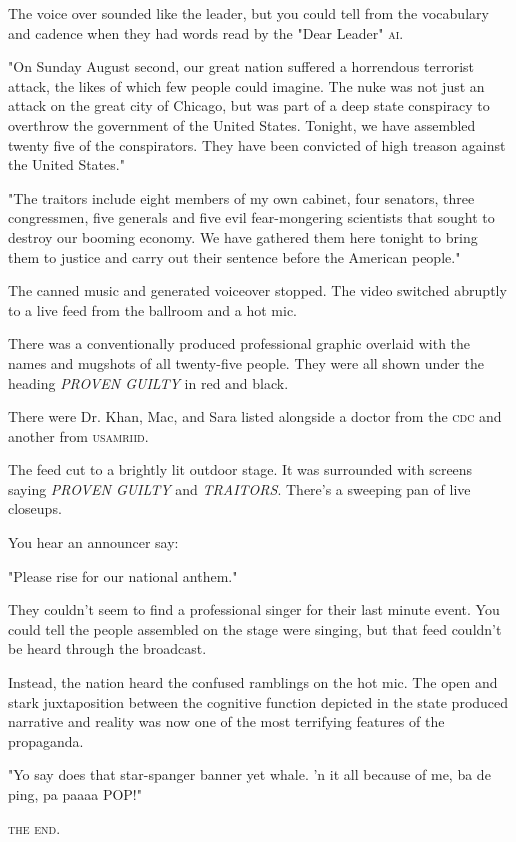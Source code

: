 \documentclass[a5paper, symmetric]{tufte-book}
\begin{document}
The voice over sounded like the leader, but you could tell from the vocabulary and cadence when they had words read by the "Dear Leader" \textsc{ai}. 

"On Sunday August second, our great nation suffered a horrendous terrorist attack, the likes of which few people could imagine. The nuke was not just an attack on the great city of Chicago, but was part of a deep state conspiracy to overthrow the government of the United States. Tonight, we have assembled twenty five of the conspirators. They have been convicted of high treason against the United States." 

"The traitors include eight members of my own cabinet, four senators, three congressmen, five generals and five evil fear-mongering scientists that sought to destroy our booming economy. We have gathered them here tonight to bring them to justice and carry out their sentence before the American people."

The canned music and generated voiceover stopped. The video switched abruptly to a live feed from the ballroom and a hot mic. 

There was a conventionally produced professional graphic overlaid with the names and mugshots of all twenty-five people. They were all shown under the heading \textit{PROVEN GUILTY} in red and black. 

There were Dr. Khan, Mac, and Sara listed alongside a doctor from the \textsc{cdc} and another from \textsc{usamriid}. 

The feed cut to a brightly lit outdoor stage. It was surrounded with screens saying \textit{PROVEN GUILTY} and \textit{TRAITORS}. There's a sweeping pan of live closeups. 

You hear an announcer say: 

"Please rise for our national anthem." 

They couldn't seem to find a professional singer for their last minute event. You could tell the people assembled on the stage were singing, but that feed couldn't be heard through the broadcast. 

Instead, the nation heard the confused ramblings on the hot mic. The open and stark juxtaposition between the cognitive function depicted in the state produced narrative and reality was now one of the most terrifying features of the propaganda. 

"Yo say does that star-spanger banner yet whale.  'n it all because of me, ba de ping, pa paaaa POP!"

\textsc{the end.}







\backmatter





\printindex
\end{document}
